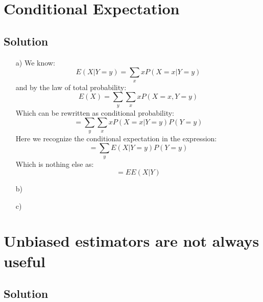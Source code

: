 \documentclass[10pt]{article}
\numberwithin{equation}{section}
\begin{document}
\section*{Conditional Expectation}

\subsection*{Solution}
\begin{enumerate}
  \item[a)]{
      We know:
      $$E(X|Y=y) = \sum_x x P(X=x|Y=y)$$
      and by the law of total probability:
      $$E(X) = \sum_y \sum_x x P(X=x, Y=y)$$
      Which can be rewritten as conditional probability:
      $$= \sum_y \sum_x x P(X=x|Y=y) P(Y=y)$$
      Here we recognize the conditional expectation in the expression:
      $$= \sum_y E(X|Y=y) P(Y=y)$$
      Which is nothing else as:
      $$= E E(X|Y)$$
    }
  \item[b)]{
    }
  \item[c)]{
    }
 
\end{enumerate}

\section*{Unbiased estimators are not always useful}
\subsection*{Solution}
\end{document}
